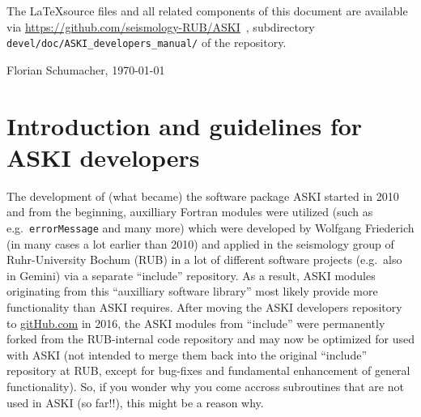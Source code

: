 \documentclass[12pt,a4paper]{article}
\newcommand{\lcode}[1]{\nolinkurl{#1}}
\newcommand{\ASKI}{ {\ttfamily ASKI} }
\begin{document}
The \LaTeX source files and all related components of this document are available via
\url{https://github.com/seismology-RUB/ASKI}~, subdirectory \lcode{devel/doc/ASKI_developers_manual/}
of the repository.
\begin{flushright}
Florian Schumacher, \mydate \today
\end{flushright}

%
\newpage
\tableofcontents
\newpage

\section{Introduction and guidelines for \ASKI{} developers} \label{sec:intro}
%
The development of (what became) the software package \ASKI{} started in 2010 and from the beginning, auxilliary
Fortran modules were utilized (such as e.g.\ \lcode{errorMessage} and many more) which were developed by
Wolfgang Friederich (in many cases a lot earlier than 2010) and applied in the seismology group of Ruhr-University
Bochum (RUB) in a lot of different software projects (e.g.\ also in Gemini) via a separate ``include'' repository. 
As a result, \ASKI{} modules 
originating from this ``auxilliary software library'' most likely provide more functionality than \ASKI{} 
requires. After moving the \ASKI{} developers repository to \url{gitHub.com} in 2016, the \ASKI{} modules from 
``include'' were permanently forked from the RUB-internal code repository and may now be optimized
for used with \ASKI{} (not intended to merge them back into the original ``include'' repository at RUB, except
for bug-fixes and fundamental enhancement of general functionality). So, if you wonder why you come accross 
subroutines that are not used in \ASKI{} (so far!!), this might be a reason why.
\end{document}
